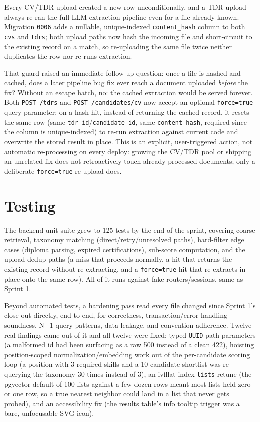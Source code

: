 Every CV/TDR upload created a new row unconditionally, and a TDR upload
always re-ran the full LLM extraction pipeline even for a file already
known. Migration \texttt{0006} adds a nullable, unique-indexed
\texttt{content\_hash} column to both \texttt{cvs} and \texttt{tdrs};
both upload paths now hash the incoming file and short-circuit to the
existing record on a match, so re-uploading the same file twice neither
duplicates the row nor re-runs extraction.

That guard raised an immediate follow-up question: once a file is
hashed and cached, does a later pipeline bug fix ever reach a document
uploaded \emph{before} the fix? Without an escape hatch, no: the cached
extraction would be served forever. Both \texttt{POST /tdrs} and
\texttt{POST /candidates/cv} now accept an optional \texttt{force=true}
query parameter: on a hash hit, instead of returning the cached record,
it resets the same row (same \texttt{tdr\_id}/\texttt{candidate\_id},
same \texttt{content\_hash}, required since the column is
unique-indexed) to re-run extraction against current code and overwrite
the stored result in place. This is an explicit, user-triggered action,
not automatic re-processing on every deploy: growing the CV/TDR pool or
shipping an unrelated fix does not retroactively touch already-processed
documents; only a deliberate \texttt{force=true} re-upload does.

\section{Testing}
\label{sec:s2-testing}

The backend unit suite grew to 125 tests by the end of the sprint,
covering coarse retrieval, taxonomy matching (direct/retry/unresolved
paths), hard-filter edge cases (diploma parsing, expired certifications),
sub-score computation, and the upload-dedup paths (a miss that proceeds
normally, a hit that returns the existing record without re-extracting,
and a \texttt{force=true} hit that re-extracts in place onto the same
row). All of it runs against fake routers/sessions, same as Sprint 1.

Beyond automated tests, a hardening pass read every file changed since
Sprint 1's close-out directly, end to end, for correctness,
transaction/error-handling soundness, N+1 query patterns, data leakage,
and convention adherence. Twelve real findings came out of it and all
twelve were fixed: typed
\texttt{UUID} path parameters (a malformed id had been surfacing as a
raw 500 instead of a clean 422), hoisting position-scoped
normalization/embedding work out of the per-candidate scoring loop (a
position with 3 required skills and a 10-candidate shortlist was
re-querying the taxonomy 30 times instead of 3), an ivfflat index
\texttt{lists} retune (the pgvector default of 100 lists against a few
dozen rows meant most lists held zero or one row, so a true nearest
neighbor could land in a list that never gets probed), and an
accessibility fix (the results table's info tooltip trigger was a bare,
unfocusable SVG icon).

